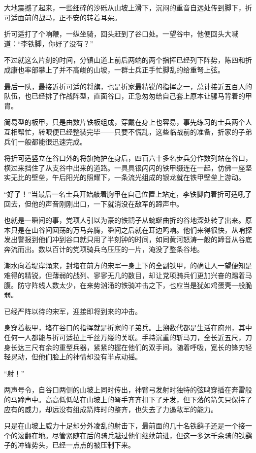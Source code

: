 大地震撼了起来，一些细碎的沙砾从山坡上滑下，沉闷的重音自远处传到脚下，折可适面前的战马，正不安的转着耳朵。

折可适打了个响鞭，一纵坐骑，回头赶到了谷口处。一望谷中，他便回头大喊道：“李铁脚，你好了没有？”

不过就这么片刻的时间，分镇山道上前后两端的两个指挥已经列下阵势，陈四和折成康也率部攀上了并不高峻的山坡，一群士兵正手忙脚乱的给重弩上弦。

最后一队，最接近折可适的将旗，也是折家最精锐的指挥之一，总计接近五百人的队伍，也已经排了作战阵型，直面谷口，正急匆匆给自己套上原本让骡马背着的甲胄。

简易型的板甲，只是由数片铁板组成，穿戴在身上也容易，事先练习的士兵两个人互相帮忙，转眼便已经整装完毕——只要不慌乱，这些临战前的准备，折家的子弟兵们一般都能很迅速完成。

将折可适竖立在谷口外的将旗掩护在身后，四百六十多名步兵分作数列站在谷口，横过来挡住了从支谷中出来的道路。一具具银闪闪的铁甲缀连在一起，仿佛一座坚实无比的壁垒，午后阳光的照耀下，一条流光组成的银龙就在铁甲壁垒上游动。

“好了！”当最后一名士兵开始敲着胸甲在自己位置上站定，李铁脚向着折可适吼了回去，但他的声音刚刚出口，一下就消没在敌军的蹄声中。

也就是一瞬间的事，党项人引以为豪的铁鹞子从蜿蜒曲折的谷地深处转了出来。原本只是在山谷间回荡的万马奔腾，瞬间之后就在耳边鸣响。他们来得很快，从哨探发出警报到他们冲到谷口就只用了半刻钟的时间，如同黄河怒涛一般的蹄音从谷底奔流而出。数以百计的党项骑兵乌压压的一片，淹没了整条谷地。

潮水向着堤岸涌来，封堵在前方的宋军一身上下的全副铁甲，的确让人一望便知是难得的精锐，但薄弱的战列、寥寥无几的数目，却让党项骑兵们更加兴奋的踢着马腹。防守阵线人数太少，在来势汹涌的铁骑冲击之下，也应当是犹如鸡蛋壳一般脆弱。

已经严阵以待的宋军，迎接即将到来的冲击。

身穿着板甲，堵在谷口的指挥就是折家的子弟兵。上溯数代都是生活在府州，其中任何一人都能与折可适拉上千丝万缕的关联。手持沉重的斩马刀，全长近五尺，刀身长达三尺有余的重型兵器，紧紧的握在他们的双手间。随着呼吸，宽长的锋刃轻轻晃动，但他们脸上的神情却没有半点动摇。

“射！”

两声号令，自谷口两侧的山坡上同时传出，神臂弓发射时独特的弦鸣穿插在奔雷般的马蹄声中。高高低低站在山坡上的弩手齐齐扣下了牙发，但下落的箭矢只保持了应有的威力，却远没有组成箭阵时的整齐，也失去了力遏敌军的能力。

只是在山坡上威力十足却分外凌乱的射击下，最前面的几十名铁鹞子还是一个接一个的滚翻在地。尽管紧随在后的骑兵越过他们继续前进，但这一多达千余骑的铁鹞子的冲锋势头，已经一点点的被压制下来。

